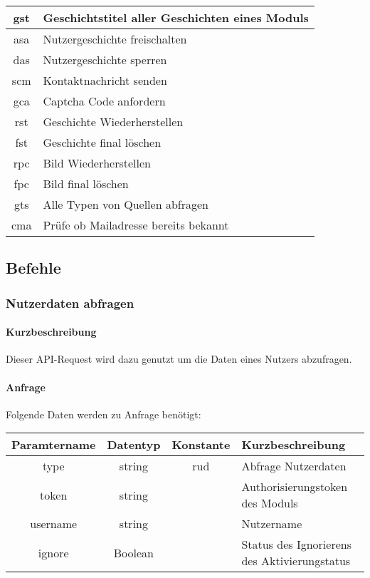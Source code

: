 \begin{longtable}[H]{|c|p{12cm}|}
		gst                 & Geschichtstitel aller Geschichten eines Moduls \\ \hline
		asa                 & Nutzergeschichte freischalten \\ \hline
		das                 & Nutzergeschichte sperren \\ \hline
		scm                 & Kontaktnachricht senden \\ \hline
		gca                 & Captcha Code anfordern \\ \hline
		rst                 & Geschichte Wiederherstellen \\ \hline
		fst                 & Geschichte final löschen \\ \hline
		rpc                 & Bild Wiederherstellen \\ \hline
		fpc                 & Bild final löschen \\ \hline
		gts                 & Alle Typen von Quellen abfragen \\ \hline
		cma					& Prüfe ob Mailadresse bereits bekannt \\ \hline
\end{longtable}
\newpage
\subsection{Befehle}
\subsubsection{Nutzerdaten abfragen}
\paragraph{Kurzbeschreibung}Dieser API-Request wird dazu genutzt um die Daten eines Nutzers abzufragen.
\paragraph{Anfrage}Folgende Daten werden zu Anfrage benötigt:
\begin{table}[H]
	\begin{tabular}{|c|c|c|p{6.5cm}|}
		\hline
		\textbf{Paramtername} & \textbf{Datentyp} & \textbf{Konstante} & \textbf{Kurzbeschreibung}                                                                                               \\ \hline
		type                & string            & rud                & Abfrage Nutzerdaten \\ \hline
		token               & string            &                    & Authorisierungstoken des Moduls \\ \hline
		username            & string            &                    & Nutzername \\ \hline
		ignore              & Boolean           &                    & Status des Ignorierens des Aktivierungstatus \\ \hline
	\end{tabular}
\end{table}
